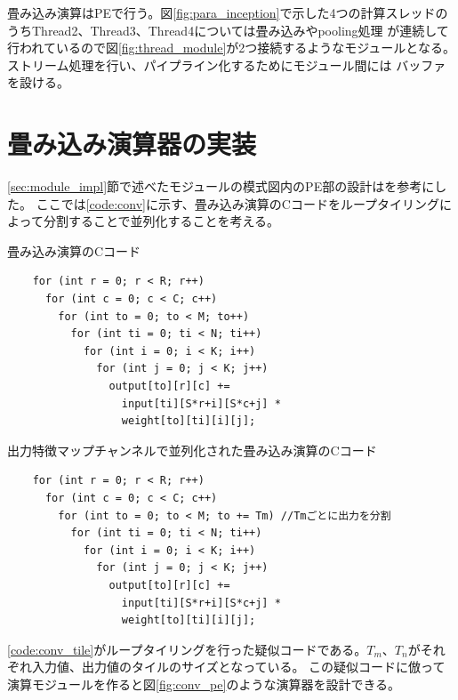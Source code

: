 {畳み込み演算はPEで行う。図\ref{fig:para_inception}で示した4つの計算スレッドのうちThread2、Thread3、Thread4については畳み込みやpooling処理
が連続して行われているので図\ref{fig:thread_module}が2つ接続するようなモジュールとなる。ストリーム処理を行い、パイプライン化するためにモジュール間には
バッファを設ける。

\section{畳み込み演算器の実装}
\label{sec:conv_impl}
\ref{sec:module_impl}節で述べたモジュールの模式図内のPE部の設計は\cite{optimized}を参考にした。
ここでは\ref{code:conv}に示す、畳み込み演算のCコードをループタイリングによって分割することで並列化することを考える。

\begin{itembox}[1]{畳み込み演算のCコード}
    \label{code:conv}
    \begin{verbatim}
    for (int r = 0; r < R; r++)
      for (int c = 0; c < C; c++)
        for (int to = 0; to < M; to++)
          for (int ti = 0; ti < N; ti++)
            for (int i = 0; i < K; i++)
              for (int j = 0; j < K; j++)
                output[to][r][c] +=
                  input[ti][S*r+i][S*c+j] *
                  weight[to][ti][i][j];
    \end{verbatim}
\end{itembox}

\begin{itembox}[1]{出力特徴マップチャンネルで並列化された畳み込み演算のCコード}
    \label{code:conv_tile}
    \begin{verbatim}
    for (int r = 0; r < R; r++)
      for (int c = 0; c < C; c++)
        for (int to = 0; to < M; to += Tm) //Tmごとに出力を分割
          for (int ti = 0; ti < N; ti++)
            for (int i = 0; i < K; i++)
              for (int j = 0; j < K; j++)
                output[to][r][c] +=
                  input[ti][S*r+i][S*c+j] *
                  weight[to][ti][i][j];
    \end{verbatim}
\end{itembox}

\ref{code:conv_tile}がループタイリングを行った疑似コードである。$T_m$、$T_n$がそれぞれ入力値、出力値のタイルのサイズとなっている。
この疑似コードに倣って演算モジュールを作ると図\ref{fig:conv_pe}のような演算器を設計できる。

}
